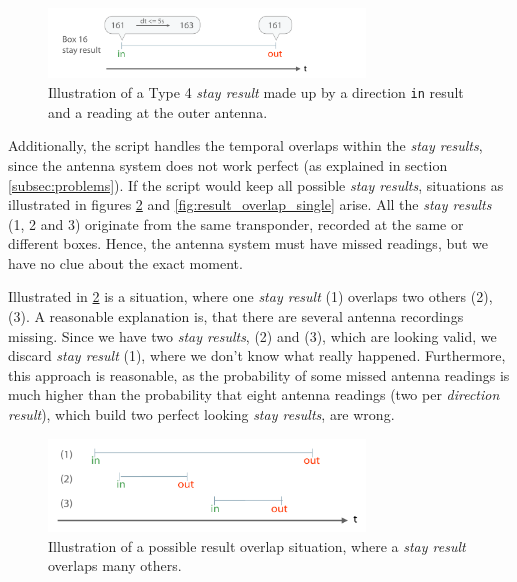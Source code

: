 \begin{figure}[htpb]
\begin{center}
  \includegraphics[width=0.75\textwidth]{assets/pdf/stay_result_type_4_schema.pdf}
  \caption[Illustration of a type 4 \textit{stay result}]{Illustration of a Type 4 \textit{stay result} made up by a direction \lstinline|in| result and a reading at the outer antenna.}
  \label{fig:type_4_stay_result}
\end{center}
\end{figure}

Additionally, the script handles the temporal overlaps within the \textit{stay results}, since the antenna system does not work perfect (as explained in section \ref{subsec:problems}). If the script would keep all possible \textit{stay results}, situations as illustrated in figures \ref{fig:result_overlap} and \ref{fig:result_overlap_single} arise. All the \textit{stay results} (1, 2 and 3) originate from the same transponder, recorded at the same or different boxes. Hence, the antenna system must have missed readings, but we have no clue about the exact moment.  

Illustrated in \ref{fig:result_overlap} is a situation, where one \textit{stay result} (1) overlaps two others (2),(3). A reasonable explanation is, that there are several antenna recordings missing. Since we have two \textit{stay results}, (2) and (3), which are looking valid, we discard \textit{stay result} (1), where we don't know what really happened. Furthermore, this approach is reasonable, as the probability of some missed antenna readings is much higher than the probability that eight antenna readings (two per \textit{direction result}), which build two perfect looking \textit{stay results}, are wrong.
 
\begin{figure}[htpb]
\begin{center}
  \includegraphics[width=0.75\textwidth]{assets/pdf/result_overlaps_schema.pdf}
  \caption[Illustration of a possible result overlap situation]{Illustration of a possible result overlap situation, where a \textit{stay result} overlaps many others.}
  \label{fig:result_overlap}
\end{center}
\end{figure}

